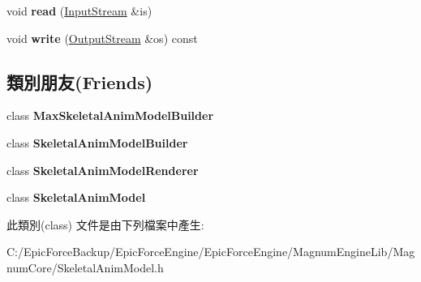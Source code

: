 \begin{DoxyCompactItemize}
\item 
void {\bfseries read} (\hyperlink{class_magnum_1_1_input_stream}{Input\+Stream} \&is)\hypertarget{class_magnum_1_1endif_1_1_vertex_buffer_a6995d00c55a27e9c64071f336a704c81}{}\label{class_magnum_1_1endif_1_1_vertex_buffer_a6995d00c55a27e9c64071f336a704c81}

\item 
void {\bfseries write} (\hyperlink{class_magnum_1_1_output_stream}{Output\+Stream} \&os) const \hypertarget{class_magnum_1_1endif_1_1_vertex_buffer_a7b8a4ace6cf899cd760ddb164a640e4d}{}\label{class_magnum_1_1endif_1_1_vertex_buffer_a7b8a4ace6cf899cd760ddb164a640e4d}

\end{DoxyCompactItemize}
\subsection*{類別朋友(Friends)}
\begin{DoxyCompactItemize}
\item 
class {\bfseries Max\+Skeletal\+Anim\+Model\+Builder}\hypertarget{class_magnum_1_1endif_1_1_vertex_buffer_a68b08defd5651552ef2b6f922eee7ff9}{}\label{class_magnum_1_1endif_1_1_vertex_buffer_a68b08defd5651552ef2b6f922eee7ff9}

\item 
class {\bfseries Skeletal\+Anim\+Model\+Builder}\hypertarget{class_magnum_1_1endif_1_1_vertex_buffer_a31d58261bc4fbf7a6c1d2d2547437974}{}\label{class_magnum_1_1endif_1_1_vertex_buffer_a31d58261bc4fbf7a6c1d2d2547437974}

\item 
class {\bfseries Skeletal\+Anim\+Model\+Renderer}\hypertarget{class_magnum_1_1endif_1_1_vertex_buffer_ae50fe2cd824b9de98af4dd4aa51d4935}{}\label{class_magnum_1_1endif_1_1_vertex_buffer_ae50fe2cd824b9de98af4dd4aa51d4935}

\item 
class {\bfseries Skeletal\+Anim\+Model}\hypertarget{class_magnum_1_1endif_1_1_vertex_buffer_a88c72f2f6b125ba518843b71080035e5}{}\label{class_magnum_1_1endif_1_1_vertex_buffer_a88c72f2f6b125ba518843b71080035e5}

\end{DoxyCompactItemize}


此類別(class) 文件是由下列檔案中產生\+:\begin{DoxyCompactItemize}
\item 
C\+:/\+Epic\+Force\+Backup/\+Epic\+Force\+Engine/\+Epic\+Force\+Engine/\+Magnum\+Engine\+Lib/\+Magnum\+Core/Skeletal\+Anim\+Model.\+h\end{DoxyCompactItemize}
